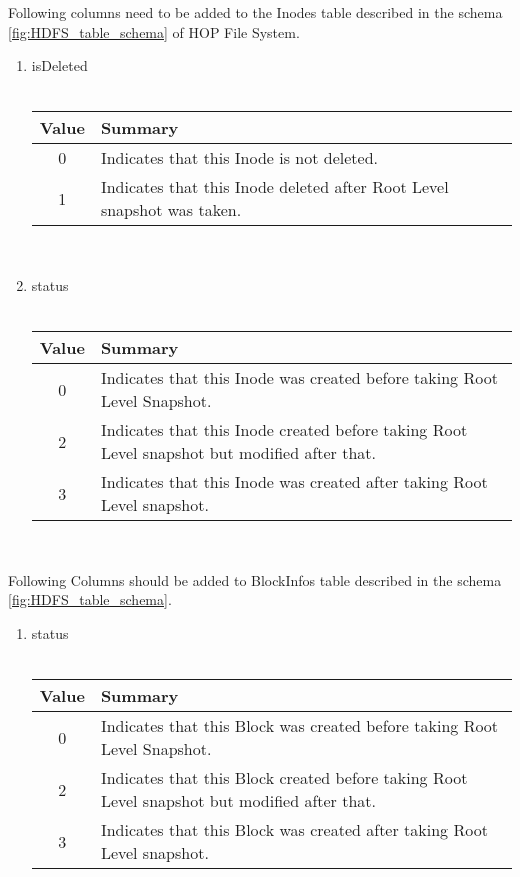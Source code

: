 Following columns need to be added to the Inodes table described in the schema \ref{fig:HDFS_table_schema} of HOP File System.
\begin{enumerate}
\item isDeleted \\\\
\begin{tabular}{|c|p{15cm}|}
\hline
Value&Summary\\
\hline
0&Indicates that this Inode is not deleted.\\
\hline
1&Indicates that this Inode deleted after Root Level snapshot was taken.\\ 
\hline
\end{tabular} \\
\item status \\\\
\begin{tabular}{|c|p{15cm}|}
\hline
Value&Summary\\
\hline
0&Indicates that this Inode was created before taking Root Level Snapshot.\\
\hline
2&Indicates that this Inode created before taking Root Level snapshot but modified after that.\\ 
\hline
3&Indicates that this Inode was created after taking Root Level snapshot.\\ 
\hline
\end{tabular} \\

\end{enumerate}
\pagebreak

Following Columns should be added to BlockInfos table described in the schema \ref{fig:HDFS_table_schema}.
\begin{enumerate}
\item status \\\\
\begin{tabular}{|c|p{15cm}|}
\hline
Value&Summary\\
\hline
0&Indicates that this Block was created before taking Root Level Snapshot.\\
\hline
2&Indicates that this Block created before taking Root Level snapshot but modified after that.\\ 
\hline
3&Indicates that this Block was created after taking Root Level snapshot.\\ 
\hline
\end{tabular} \\
\end{enumerate}

